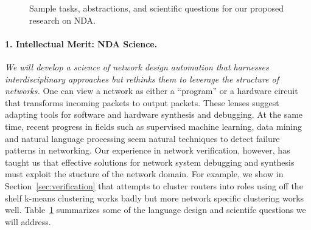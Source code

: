 
\begin{figure}[t]
\centerline{}
\caption{Sample tasks, abstractions, and scientific questions for our
  proposed research on NDA.}
\vspace{2mm}
\label{scientificquestions}
\end{figure}


\paragraph*{1. Intellectual Merit: NDA Science.} {\em We will develop a science of network design automation that harnesses interdisciplinary approaches but rethinks them to leverage the structure of networks.} One can view a network as either a ``program'' or a hardware circuit that transforms incoming packets to output packets.  These lenses suggest adapting tools for software and hardware synthesis and debugging.  At the same time, recent progress in fields such as supervised machine learning, data mining and natural language processing seem natural techniques to detect failure patterns in networking.  Our experience in network verification, however, has taught us
that effective solutions for network system debugging and synthesis must exploit the stucture of the network domain.  For example, we show in Section~\ref{sec:verification} that attempts to cluster routers into roles using off  the
shelf k-means clustering works badly but more network specific clustering
works well. Table~\ref{scientificquestions} summarizes some of the language design and scientifc questions we will address.

